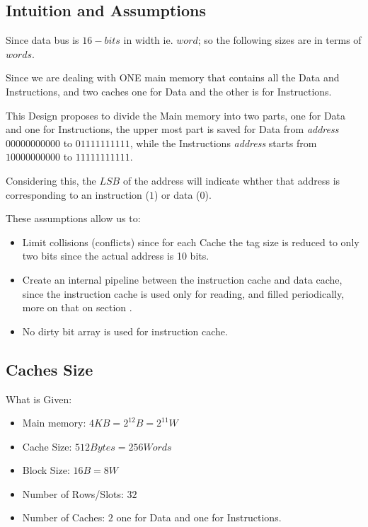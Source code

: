\subsection{Intuition and Assumptions}
\label{intuitionSection}
    Since data bus is $16-bits$ in width ie. $word$; so the following sizes are in terms of $words$.
    
    Since we are dealing with ONE main memory that contains all the Data and Instructions,
    and two caches one for Data and the other is for Instructions.

    This Design proposes to divide the Main memory into two parts, one for Data and one for Instructions,
    the upper most part is saved for Data from \textit{address} $00000000000$ to $01111111111$, while the Instructions
    \textit{address} starts from $10000000000$ to $11111111111$.

    Considering this, the $LSB$ of the address will indicate whther that address is corresponding to
    an instruction ($1$) or data ($0$).

    These assumptions allow us to:
    \begin{itemize}
        \item Limit collisions (conflicts) since for each Cache the tag size is reduced
            to only two bits since the actual address is 10 bits.
        \item Create an internal pipeline between the instruction cache and data cache,
            since the instruction cache is used only for reading, and filled periodically, more on 
            that on section .
        \item No dirty bit array is used for instruction cache.
    \end{itemize}
     
\subsection{Caches Size}
    What is Given:
    \begin{itemize}
        \item Main memory: $4KB = 2^{12}B =2^{11} W$
        \item Cache Size: $512 Bytes = 256Words$
        \item Block Size: $16B = 8W$
        \item Number of Rows/Slots: $32$
        \item Number of Caches: $2$ one for Data and one for Instructions.
    \end{itemize}

